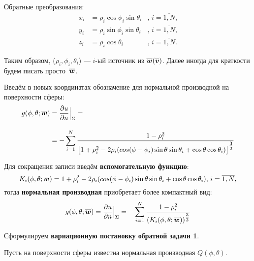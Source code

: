 Обратные преобразования:
\begin{equation}
	\begin{aligned}
		x_i
		&=
		\rho_i \cos{\phi_i} \sin{\theta_i}
		&\text{, }
		i=\overline{1,N}
		\text{,}
		\\[10pt]
		y_i
		&=
		\rho_i \sin{\phi_i} \sin{\theta_i}
		&\text{, }
		i=\overline{1,N}
		\text{,}
		\\[10pt]
		z_i
		&=
		\rho_i \cos{\theta_i}
		&\text{, }
		i=\overline{1,N}
		\text{.}
	\end{aligned}
\end{equation}

Таким образом, ($\rho_i, \phi_i, \theta_i$) --- $i$-ый источник из $\boldsymbol{\overline{w}}(\boldsymbol{\overline{v}})$. Далее иногда для краткости будем писать просто~$\boldsymbol{\overline{w}}$.

Введём в новых координатах обозначение для нормальной производной на поверхности сферы:
\begin{equation}
	\begin{split}
		g(\phi, \theta; \boldsymbol{\overline{w}}) &=
		\frac{\partial u}{\partial n}
		\Big|_\Sigma =\\[10pt]
		&=
		-
		\sum_{i = 1}^{N} \frac{1 - \rho_i^2}
		{
			\big[
			1 + \rho_i^2 - 2\rho_i
			(cos(\phi - \phi_i)\sin\theta \sin\theta_i + \cos\theta \cos\theta_i
			)
			\big]^{\tfrac{3}{2}}}
	\end{split}
\end{equation}

Для сокращения записи введём \textbf{вспомогательную функцию}:
\begin{equation}
	K_i(\phi, \theta; \boldsymbol{\overline{w}}) = 1 + \rho_i^2 - 2\rho_i(cos(\phi - \phi_i)\sin\theta \sin\theta_i + \cos\theta \cos\theta_i)\text{, }i=\overline{1,N}\text{,}
\end{equation}
тогда \textbf{нормальная производная} приобретает более компактный вид:
\begin{equation}
	\begin{split}
		g(\phi, \theta; \boldsymbol{\overline{w}}) =
		\frac{\partial u}{\partial n} \Big|_\Sigma =
		-
		\sum_{i = 1}^{N}
		\frac{1 - \rho_i^2}
		{(K_i(\phi, \theta; \boldsymbol{\overline{w}}))^{\tfrac{3}{2}}}
	\end{split}
\end{equation}

Сформулируем \textbf{вариационную постановку обратной задачи 1}.

Пусть на поверхности сферы известна нормальная производная $Q(\phi, \theta)$.

